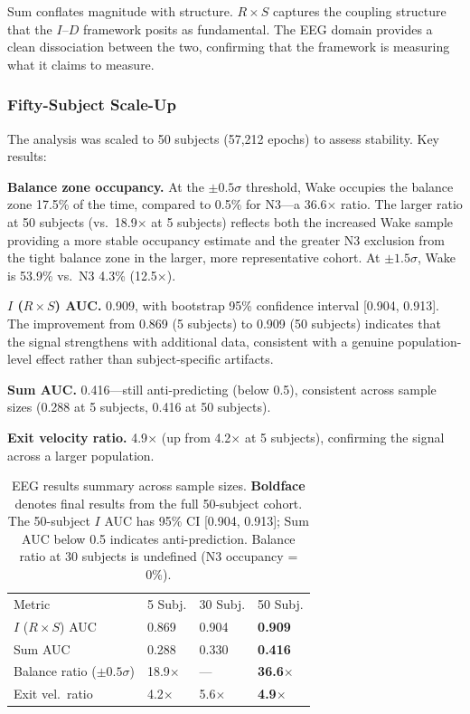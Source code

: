 \documentclass[aip,cha,reprint,amsmath,amssymb,final,floatfix]{revtex4-2}
\begin{document}
Sum conflates magnitude with structure. $R \times S$ captures the coupling structure that the $I$--$D$ framework posits as fundamental. The EEG domain provides a clean dissociation between the two, confirming that the framework is measuring what it claims to measure.

\subsubsection{Fifty-Subject Scale-Up}

The analysis was scaled to 50 subjects (57,212 epochs) to assess stability. Key results:

\textbf{Balance zone occupancy.} At the $\pm 0.5\sigma$ threshold, Wake occupies the balance zone 17.5\% of the time, compared to 0.5\% for N3---a 36.6$\times$ ratio. The larger ratio at 50 subjects (vs.\ 18.9$\times$ at 5 subjects) reflects both the increased Wake sample providing a more stable occupancy estimate and the greater N3 exclusion from the tight balance zone in the larger, more representative cohort. At $\pm 1.5\sigma$, Wake is 53.9\% vs.\ N3 4.3\% (12.5$\times$).

\textbf{$I$ ($R \times S$) AUC.} 0.909, with bootstrap 95\% confidence interval [0.904, 0.913]. The improvement from 0.869 (5 subjects) to 0.909 (50 subjects) indicates that the signal strengthens with additional data, consistent with a genuine population-level effect rather than subject-specific artifacts.

\textbf{Sum AUC.} 0.416---still anti-predicting (below 0.5), consistent across sample sizes (0.288 at 5 subjects, 0.416 at 50 subjects).

\textbf{Exit velocity ratio.} 4.9$\times$ (up from 4.2$\times$ at 5 subjects), confirming the signal across a larger population.

\begin{table}[!htbp]
\caption[EEG results summary across 5, 30, and 50 subject sample sizes]{\label{tab:eeg}EEG results summary across sample sizes. \textbf{Boldface} denotes final results from the full 50-subject cohort. The 50-subject $I$ AUC has 95\% CI [0.904, 0.913]; Sum AUC below 0.5 indicates anti-prediction. Balance ratio at 30 subjects is undefined (N3 occupancy = 0\%).}
\begin{ruledtabular}
\begin{tabular}{p{2.4cm}lll}
Metric & 5 Subj. & 30 Subj. & 50 Subj. \\
$I$ ($R{\times}S$) AUC & 0.869 & 0.904 & \textbf{0.909} \\
Sum AUC & 0.288 & 0.330 & \textbf{0.416} \\
Balance ratio ($\pm 0.5\sigma$) & 18.9$\times$ & --- & \textbf{36.6$\times$} \\
Exit vel.\ ratio & 4.2$\times$ & 5.6$\times$ & \textbf{4.9$\times$} \\
\end{tabular}
\end{ruledtabular}
\end{table}
\end{document}
